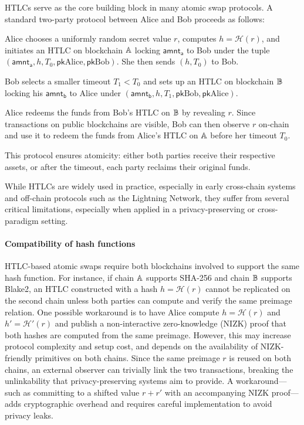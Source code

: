 HTLCs serve as the core building block in many atomic swap protocols. A standard two-party protocol between Alice and Bob proceeds as follows:

Alice chooses a uniformly random secret value $r$, computes $h = \mathcal{H}(r)$, and initiates an HTLC on blockchain $\mathbb{A}$ locking $\mathsf{amnt_a}$ to Bob under the tuple $(\mathsf{amnt_a}, h, T_0, \mathsf{pk}\text{Alice}, \mathsf{pk}\text{Bob})$. She then sends $(h, T_0)$ to Bob.

Bob selects a smaller timeout $T_1 < T_0$ and sets up an HTLC on blockchain $\mathbb{B}$ locking his $\mathsf{amnt_b}$ to Alice under $(\mathsf{amnt_b}, h, T_1, \mathsf{pk}\text{Bob}, \mathsf{pk}\text{Alice})$.

Alice redeems the funds from Bob’s HTLC on $\mathbb{B}$ by revealing $r$. Since transactions on public blockchains are visible, Bob can then observe $r$ on-chain and use it to redeem the funds from Alice’s HTLC on $\mathbb{A}$ before her timeout $T_0$.

This protocol ensures atomicity: either both parties receive their respective assets, or after the timeout, each party reclaims their original funds.

While HTLCs are widely used in practice, especially in early cross-chain systems and off-chain protocols such as the Lightning Network, they suffer from several critical limitations, especially when applied in a privacy-preserving or cross-paradigm setting.

\paragraph*{Compatibility of hash functions}
HTLC-based atomic swaps require both blockchains involved to support the same hash function. For instance, if chain $\mathbb{A}$ supports SHA-256 and chain $\mathbb{B}$ supports Blake2, an HTLC constructed with a hash $h = \mathcal{H}(r)$ cannot be replicated on the second chain unless both parties can compute and verify the same preimage relation. One possible workaround is to have Alice compute $h = \mathcal{H}(r)$ and $h' = \mathcal{H}'(r)$ and publish a non-interactive zero-knowledge (NIZK) proof that both hashes are computed from the same preimage. However, this may increase protocol complexity and setup cost, and depends on the availability of NIZK-friendly primitives on both chains. Since the same preimage $r$ is reused on both chains, an external observer can trivially link the two transactions, breaking the unlinkability that privacy-preserving systems aim to provide. A workaround—such as committing to a shifted value $r + r'$ with an accompanying NIZK proof—adds cryptographic overhead and requires careful implementation to avoid privacy leaks.
